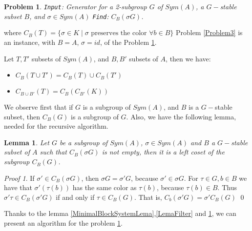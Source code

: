 \documentclass[12pt,a4paper]{book}
\theoremstyle{plain}
\newtheorem{problem}{Problem}
\newtheorem{lema}{Lemma}
\theoremstyle{definition}
\theoremstyle{remark}
\newtheorem*{Proof}{Proof}
\begin{document}
\begin{problem}\label{Problem4}
 \texttt{Input}: Generator for a 2-subgroup $G$ of $Sym(A)$, a $G-$stable subset $B$, and $\sigma \in Sym(A)$
 \texttt{Find}: $C_B( \sigma G)$.
\end{problem}
where $C_B(T) = \{ \sigma \in K \; | \; \sigma \mbox{ preserves the color } \forall b \in B \} $  
Problem \ref{Problem3} is an instance, with $B=A$, $\sigma=id$, of the Problem \ref{Problem4}.

Let $T, T'$ subsets of $Sym(A)$, and $B, B'$ subsets of $A$, then we have:
\begin{itemize}
 \item $C_B( T \cup T' ) = C_B (T) \cup C_B(T')$
 \item $C_{B \cup B' } (T) = C_B ( C_{B'} (K))$
\end{itemize}

We observe first that if $G$ is a subgroup of $Sym(A)$, and $B$ is a $G-$stable subset, then $C_B(G)$ is a subgroup of $G$. Also, we have the following lemma, needed  for  the recursive algorithm.

\begin{lema}\label{LeftCoset}
 Let $G$ be a subgroup of $Sym(A)$, $\sigma \in Sym(A)$ and $B$ a $G-$stable subset of $A$ such that $C_B( \sigma G)$ is not empty,  then it is a left coset of the subgroup $C_B(G)$.
\end{lema}

\begin{Proof}
 If $\sigma' \in C_B(\sigma G)$, then $\sigma G = \sigma' G$, because $\sigma' \in \sigma G$.  For $\tau \in G, b \in B$ we have that $\sigma' ( \tau (b))$ 
 has the 
same color as $\tau (b)$, because  $\tau (b) \in B$. Thus $\sigma' \tau \in C_B ( \sigma' G )$ if and only if $\tau \in C_B(G)$. That is,
$C_b( \sigma' G) = \sigma' C_B( G)$
\qed  \end{Proof}

Thanks to the lemma \ref{MinimalBlockSystemLema},\ref{LemaFilter} and \ref{LeftCoset}, we can present an algorithm for the problem \ref{Problem4}.
\end{document}
